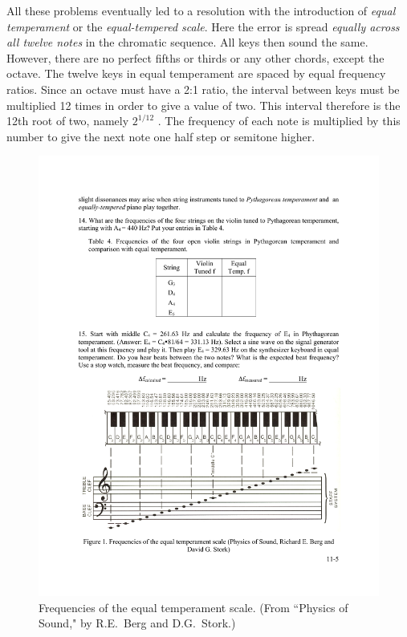 \documentclass[11pt]{NSF}
\begin{document}
All these problems eventually led to a resolution with the
introduction of {\em equal temperament} or the {\em equal-tempered
scale}. 
Here the error is spread {\em equally across all twelve notes} 
in the chromatic sequence. 
All keys then sound the same. However, there are no perfect 
fifths or thirds or any other chords, except the octave. The twelve
keys in equal temperament are spaced by equal frequency ratios. Since
an octave must have a 2:1 ratio, the interval between keys must be
multiplied 12 times in order to give a value of two. This interval
therefore is the 12th root of two, namely $2^{1/12}$ . 
The frequency of
each note is multiplied by this number to give the next note one half
step or semitone higher.
%
\begin{figure}[hbtp]
\begin{center}
\includegraphics[width=.95\textwidth]{fig11_1}
\caption{Frequencies of the equal temperament scale.
(From ``Physics of Sound," by R.E.~Berg and D.G.~Stork.)}
\label{f:1}
\end{center}
\end{figure}
%
\end{document}
